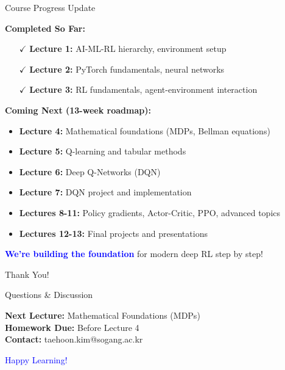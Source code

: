 \documentclass[aspectratio=169,10pt]{beamer}
\begin{document}
\begin{frame}{Course Progress Update}

\textbf{Completed So Far:}
\begin{itemize}
    \item[$\checkmark$] \textbf{Lecture 1:} AI-ML-RL hierarchy, environment setup
    \item[$\checkmark$] \textbf{Lecture 2:} PyTorch fundamentals, neural networks  
    \item[$\checkmark$] \textbf{Lecture 3:} RL fundamentals, agent-environment interaction
\end{itemize}

\vfill

\textbf{Coming Next (13-week roadmap):}
\begin{itemize}
    \item \textbf{Lecture 4:} Mathematical foundations (MDPs, Bellman equations)
    \item \textbf{Lecture 5:} Q-learning and tabular methods
    \item \textbf{Lecture 6:} Deep Q-Networks (DQN)
    \item \textbf{Lecture 7:} DQN project and implementation
    \item \textbf{Lectures 8-11:} Policy gradients, Actor-Critic, PPO, advanced topics
    \item \textbf{Lectures 12-13:} Final projects and presentations
\end{itemize}

\vfill

\textcolor{blue}{\textbf{We're building the foundation}} for modern deep RL step by step!

\end{frame}

\begin{frame}[plain]
\begin{center}
\Huge Thank You!

\vfill

\Large Questions \& Discussion

\vfill

\normalsize
\textbf{Next Lecture:} Mathematical Foundations (MDPs)\\
\textbf{Homework Due:} Before Lecture 4\\
\textbf{Contact:} taehoon.kim@sogang.ac.kr

\vfill

\textcolor{blue}{Happy Learning!}
\end{center}
\end{frame}
\end{document}
